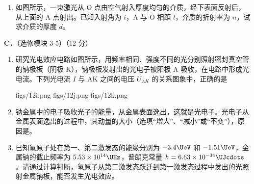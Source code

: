 \documentclass[\gkver]{gaokaozhenti}
\begin{document}
\begin{enumerate}
\begin{enumerate}
	\item
	如图所示，一束激光从 O 点由空气射入厚度均匀的介质，经下表面反射后，从上面的 A 点射出。已知入射角为 $i$，A 与 O 相距 $l$，介质的折射率为 $n$，试求介质的厚度 $d$。

\end{enumerate}

\textbf{C．}（选修模块 3-5）（12 分）

\begin{enumerate}
	\item
	研究光电效应电路如图所示，用频率相同、强度不同的光分别照射密封真空管的钠极板（阴极 K），钠极板发射出的光电子被阳极 A 吸收，在电路中形成光电流。下列光电流 $I$ 与 AK 之间的电压 $U_{AK}$ 的关系图象中，正确的是


	{figs/12i.png}
	{figs/12j.png}
	{figs/12k.png}
	\item
	钠金属中的电子吸收光子的能量，从金属表面逸出，这就是光电子。光电子从金属表面逸出的过程中，其动量的大小（选填“增大”、“减小”或“不变”），原因是。
	\item
	已知氢原子处在第一、第二激发态的能级分别为 $-3.4\UeV$ 和 $-1.51\UeV$，金属钠的截止频率为 $5.53\times10^{14}\UHz$，普朗克常量 $h=6.63\times10^{-34}\UJcdots$。请通过计算判断，氢原子从第二激发态跃迁到第一激发态过程中发出的光照射金属钠板，能否发生光电效应。
\end{enumerate}

\end{enumerate}
\end{document}
